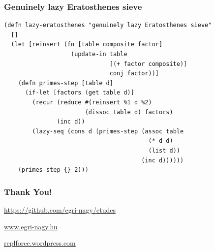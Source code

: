 \documentclass{beamer}
\begin{document}
\begin{frame}[fragile]
\frametitle{Genuinely lazy Eratosthenes sieve}
\begin{verbatim}
(defn lazy-eratosthenes "genuinely lazy Eratosthenes sieve"
  []
  (let [reinsert (fn [table composite factor]
                   (update-in table
                              [(+ factor composite)]
                              conj factor))]
    (defn primes-step [table d]
      (if-let [factors (get table d)]
        (recur (reduce #(reinsert %1 d %2)
                       (dissoc table d) factors)
               (inc d))
        (lazy-seq (cons d (primes-step (assoc table
                                         (* d d)
                                         (list d))
                                       (inc d))))))
    (primes-step {} 2)))
\end{verbatim}
\end{frame}

\begin{frame}\frametitle{Thank You!}
\begin{center}
\huge
\url{https://github.com/egri-nagy/etudes}

\url{www.egri-nagy.hu}

\url{replforce.wordpress.com}

\end{center}
\end{frame}
\end{document}
